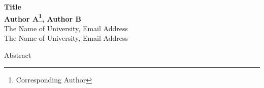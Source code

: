 \documentclass[a0,12pt,portrait]{a0poster}
\theoremstyle{definition}
\numberwithin{equation}{section}
\begin{document}
 \BgThispage
  \vspace{.5cm}
\begin{center}
\Huge \color{NavyBlue} \textbf{Title} \color{Black}\\[0.75cm] %
\huge \textbf{Author A\footnote{\Large Corresponding Author}, Author B}\\[0.05cm] %
The Name of University, Email Address \\[0.5cm]
The Name of University, Email Address\\[0.5cm] 
\end{center}
\vspace{1cm} %

\begin{center}
\Huge Abstract
\end{center}
\end{document}
